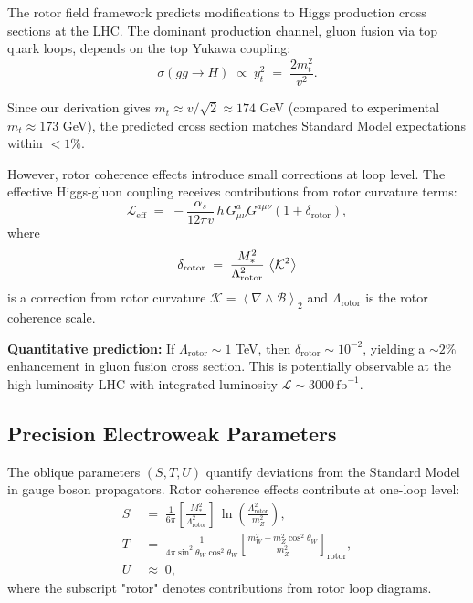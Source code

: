 \documentclass[11pt,a4paper]{article}
\newcommand{\grade}[2]{\left\langle #1 \right\rangle_{#2}}
\newcommand{\biv}[1]{\grade{#1}{2}}
\newcommand{\Biv}{\mathcal{B}}
\newcommand{\D}{\nabla}                        %
\newcommand{\Lag}{\mathcal{L}}
\theoremstyle{definition}
\theoremstyle{plain}
\theoremstyle{remark}
\begin{document}
The rotor field framework predicts modifications to Higgs production cross sections at the LHC. The dominant production channel, gluon fusion via top quark loops, depends on the top Yukawa coupling:
\begin{equation}
  \sigma(gg \to H) \;\propto\; y_t^2 \;=\; \frac{2m_t^2}{v^2}.
\end{equation}

Since our derivation gives $m_t \approx v/\sqrt{2} \approx 174$ GeV (compared to experimental $m_t \approx 173$ GeV), the predicted cross section matches Standard Model expectations within $<1\%$.

However, rotor coherence effects introduce small corrections at loop level. The effective Higgs-gluon coupling receives contributions from rotor curvature terms:
\begin{equation}
  \Lag_{\text{eff}} \;=\; -\frac{\alpha_s}{12\pi v}\,h\,G_{\mu\nu}^a G^{a\mu\nu}\left(1 + \delta_{\text{rotor}}\right),
\end{equation}
where
\begin{equation}
  \delta_{\text{rotor}} \;=\; \frac{M_\ast^2}{\Lambda_{\text{rotor}}^2}\,\ev{\mathcal{K}^2}
\end{equation}
is a correction from rotor curvature $\mathcal{K} = \biv{\D\wedge\Biv}$ and $\Lambda_{\text{rotor}}$ is the rotor coherence scale.

\textbf{Quantitative prediction:} If $\Lambda_{\text{rotor}} \sim 1$ TeV, then $\delta_{\text{rotor}} \sim 10^{-2}$, yielding a $\sim 2\%$ enhancement in gluon fusion cross section. This is potentially observable at the high-luminosity LHC with integrated luminosity $\mathcal{L} \sim 3000\,\text{fb}^{-1}$.

\subsection{Precision Electroweak Parameters}

The oblique parameters $(S, T, U)$ quantify deviations from the Standard Model in gauge boson propagators. Rotor coherence effects contribute at one-loop level:
\begin{align}
  S &\;=\; \frac{1}{6\pi}\left[\frac{M_\ast^2}{\Lambda_{\text{rotor}}^2}\right]\,\ln\left(\frac{\Lambda_{\text{rotor}}^2}{m_Z^2}\right), \\
  T &\;=\; \frac{1}{4\pi\sin^2\theta_W\cos^2\theta_W}\left[\frac{m_W^2 - m_Z^2\cos^2\theta_W}{m_Z^2}\right]_{\text{rotor}}, \\
  U &\;\approx\; 0,
\end{align}
where the subscript "rotor" denotes contributions from rotor loop diagrams.
\end{document}
